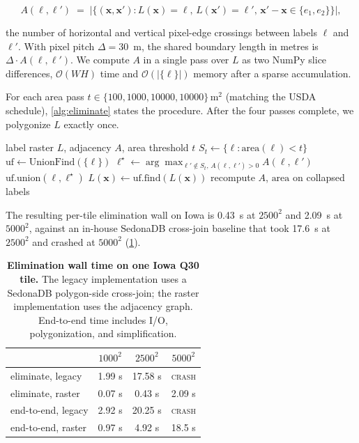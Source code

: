 \documentclass[preprint,12pt]{elsarticle}
\begin{document}
\[
A(\ell, \ell') \;=\; \bigl|\{(\mathbf{x}, \mathbf{x}') :
   L(\mathbf{x})=\ell,\, L(\mathbf{x}')=\ell',\, \mathbf{x}'\!-\!\mathbf{x} \in \{e_1, e_2\}\}\bigr|,
\]

the number of horizontal and vertical pixel-edge crossings between
labels $\ell$ and $\ell'$. With pixel pitch $\Delta = 30$~m, the shared
boundary length in metres is $\Delta \cdot A(\ell, \ell')$. We compute
$A$ in a single pass over $L$ as two NumPy slice differences,
$\mathcal{O}(WH)$ time and $\mathcal{O}(|\{\ell\}|)$ memory after a
sparse accumulation.

For each area pass $t \in \{100, 1000, 10000, 10000\}\,\si{\meter\squared}$
(matching the USDA schedule), \cref{alg:eliminate} states the procedure.
After the four passes complete, we polygonize $L$ exactly once.

\begin{algorithm}[t]
\caption{Raster-side \textsc{Eliminate(LENGTH)} pass}
\label{alg:eliminate}
\begin{algorithmic}[1]
\REQUIRE label raster $L$, adjacency $A$, area threshold $t$
\STATE $S_t \gets \{\ell : \text{area}(\ell) < t\}$
\STATE $\text{uf} \gets \text{UnionFind}(\{\ell\})$
    \STATE $\ell^\star \gets \arg\max_{\ell' \notin S_t,\, A(\ell,\ell')>0} A(\ell, \ell')$
        \STATE $\text{uf.union}(\ell, \ell^\star)$
    \ENDIF
\ENDFOR
\STATE $L(\mathbf{x}) \gets \text{uf.find}(L(\mathbf{x}))$ 
\STATE recompute $A$, $\text{area}$ on collapsed labels
\end{algorithmic}
\end{algorithm}

The resulting per-tile elimination wall on Iowa is 0.43~s at $2500^2$
and 2.09~s at $5000^2$, against an in-house SedonaDB cross-join baseline
that took 17.6~s at $2500^2$ and crashed at $5000^2$
(\cref{tab:eliminate}).

\begin{table}[t]
\centering
\caption{\textbf{Elimination wall time on one Iowa Q30 tile.} The legacy
implementation uses a SedonaDB polygon-side cross-join; the raster
implementation uses the adjacency graph. End-to-end time includes I/O,
polygonization, and simplification.}
\label{tab:eliminate}
\small
\begin{tabular}{lccc}
\toprule
& $1000^2$ & $2500^2$ & $5000^2$ \\
\midrule
eliminate, legacy   & 1.99 s & 17.58 s & \textsc{crash} \\
eliminate, raster   & 0.07 s & 0.43 s  & 2.09 s \\
end-to-end, legacy  & 2.92 s & 20.25 s & \textsc{crash} \\
end-to-end, raster  & 0.97 s & 4.92 s  & 18.5 s \\
\bottomrule
\end{tabular}
\end{table}
\end{document}
